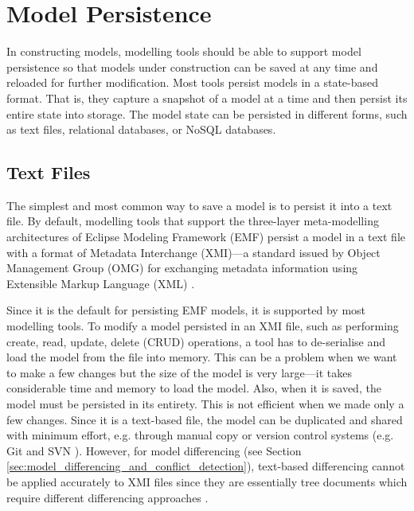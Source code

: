 \section{Model Persistence}
\label{sec:model_persistence}
In constructing models, modelling tools should be able to support model persistence so that models under construction can be saved at any time and reloaded for further modification. Most tools persist models in a state-based format. That is, they capture a snapshot of a model at a time and then persist its entire state into storage. The model state can be persisted in different forms, such as text files, relational databases, or NoSQL databases.

\subsection{Text Files}
\label{sec:text_file}
The simplest and most common way to save a model is to persist it into a text file. By default, modelling tools that support the three-layer meta-modelling architectures of Eclipse Modeling Framework (EMF) \cite{steinberg2008emf} persist a model in a text file with a format of Metadata Interchange (XMI)—a standard issued by Object Management Group (OMG) for exchanging metadata information using Extensible Markup Language (XML) \cite{omg2018xmi}.

Since it is the default for persisting EMF models, it is supported by most modelling tools. To modify a model persisted in an XMI file, such as performing create, read, update, delete (CRUD) operations, a tool has to de-serialise and load the model from the file into memory. This can be a problem when we want to make a few changes but the size of the model is very large—it takes considerable time and memory to load the model. Also, when it is saved, the model must be persisted in its entirety. This is not efficient when we made only a few changes. Since it is a text-based file, the model can be duplicated and shared with minimum effort, e.g. through manual copy or version control systems (e.g. Git \cite{git2019about} and SVN \cite{apache2019svn}). However, for model differencing (see Section \ref{sec:model_differencing_and_conflict_detection}), text-based differencing \cite{DBLP:journals/algorithmica/Meyers86} cannot be applied accurately to XMI files since they are essentially tree documents which require different differencing approaches \cite{wang2003xdiff}.

